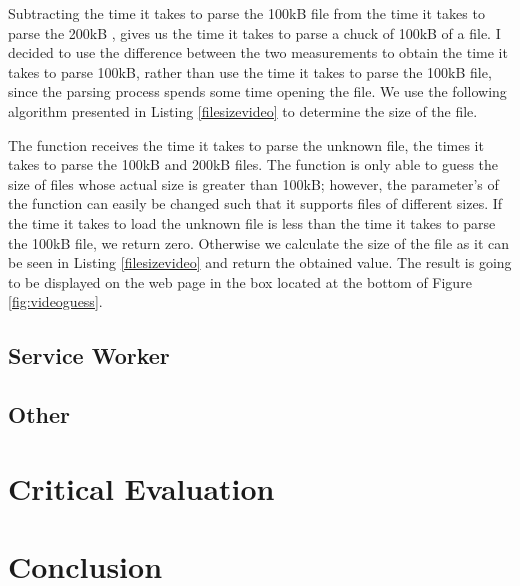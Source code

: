 \documentclass[10pt,a4paper,twoside]{book}
\begin{document}
Subtracting the time it takes to parse the 100kB file  from the time it takes to parse the 200kB , gives us the time it takes to parse a chuck of 100kB of a file. I decided to use the difference between the two measurements to obtain the time it takes to parse 100kB, rather than use the time it takes to parse the 100kB file, since the parsing process spends some time opening the file. We use the following algorithm presented in Listing \ref{filesizevideo} to determine the size of the file.

The function receives the time it takes to parse the unknown file, the times it takes to parse the 100kB and 200kB files. The function is only able to guess the size of files whose actual size is greater than 100kB; however, the parameter's of the function can easily be changed such that it supports files of different sizes. If the time it takes to load the unknown file is less than the time it takes to parse the 100kB file, we return zero. Otherwise we calculate the size of the file as it can be seen in Listing \ref{filesizevideo} and return the obtained value. The result is going to be displayed on the web page in the box located at the bottom of Figure \ref{fig:videoguess}.

\section{Service Worker}


\section{Other}




\chapter{Critical Evaluation}
\label{chap:evaluation}



\chapter{Conclusion}
\label{chap:conclusion}




\cleardoublepage
\pagestyle{marked}



\end{document}
